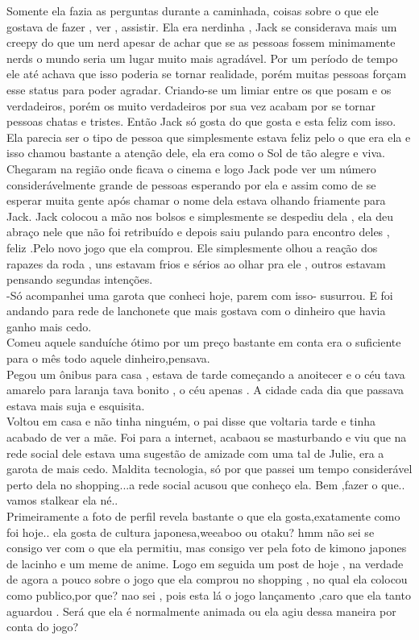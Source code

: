\documentclass{book}
\begin{document}
 Somente ela fazia as perguntas durante a caminhada, coisas sobre o que ele gostava de fazer , ver , assistir. Ela era nerdinha , Jack se considerava mais um creepy do que um nerd apesar de achar que se as pessoas fossem minimamente nerds o mundo seria um lugar muito mais agradável. Por um período de tempo ele até achava que isso poderia se tornar realidade, porém muitas pessoas forçam esse status para poder agradar. Criando-se um limiar entre os que posam e os verdadeiros, porém os muito verdadeiros por sua vez acabam por se tornar pessoas chatas e tristes. Então Jack só gosta do que gosta e esta feliz com isso. Ela parecia ser o tipo de pessoa que simplesmente estava feliz pelo o que era ela e isso chamou bastante a atenção dele, ela era como o Sol de tão alegre e viva. \\Chegaram na região onde ficava o cinema e logo Jack pode ver um número considerávelmente grande de pessoas esperando por ela e assim como de se esperar muita gente após chamar o nome dela estava olhando friamente para Jack. Jack colocou a mão nos bolsos e simplesmente se despediu dela , ela deu abraço nele que não foi retribuído e depois saiu pulando para encontro deles , feliz .Pelo novo jogo que ela comprou. Ele simplesmente olhou a reação dos rapazes da roda , uns estavam frios e sérios ao olhar pra ele , outros estavam pensando segundas intenções.\\
 -Só acompanhei uma garota que conheci hoje, parem com isso- susurrou. E foi andando para rede de lanchonete que mais gostava com o dinheiro que havia ganho mais cedo.\\
 Comeu aquele sanduíche ótimo por um preço bastante em conta era o suficiente para o mês todo aquele dinheiro,pensava.\\
 Pegou um ônibus para casa , estava de tarde começando a anoitecer e o céu tava amarelo para laranja tava bonito , o céu apenas . A cidade cada dia que passava estava mais suja e esquisita.\\
 Voltou em casa e não tinha ninguém, o pai disse que voltaria tarde e tinha acabado de ver a mãe. Foi para a internet, acabaou se masturbando e viu que na rede social dele estava uma sugestão de amizade com uma tal de Julie, era a garota de mais cedo. Maldita tecnologia, só por que passei um tempo considerável perto dela no shopping...a rede social acusou que conheço ela. Bem ,fazer o que.. vamos stalkear ela né..\\
 Primeiramente a foto de perfil revela bastante o que ela gosta,exatamente como foi hoje.. ela gosta de cultura japonesa,weeaboo ou otaku? hmm não sei se consigo ver com o que ela permitiu, mas consigo ver pela foto de kimono japones de lacinho e um meme de anime. Logo em seguida um post de hoje , na verdade de agora a pouco sobre o jogo que ela comprou no shopping , no qual ela colocou como publico,por que? nao sei , pois esta lá o jogo lançamento ,caro que ela tanto aguardou . Será que ela é normalmente animada ou ela agiu dessa maneira por conta do jogo?\\
\end{document}
